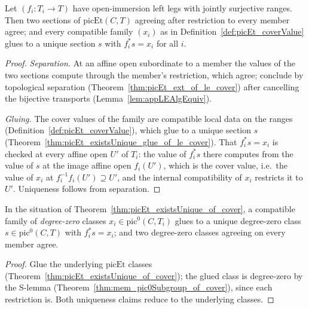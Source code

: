 \begin{theorem}
  \label{thm:picEt_existsUnique_of_cover}
  \leanok
  Let \((f_i \colon T_i \to T)\) have open-immersion left legs with jointly surjective
  ranges. Then two sections of \(\mathrm{picEt}(C,T)\) agreeing after restriction to every
  member agree; and every compatible family \((x_i)\) as in
  Definition~\ref{def:picEt_coverValue} glues to a unique section \(s\) with
  \(f_i^{*} s = x_i\) for all \(i\).
\end{theorem}
\begin{proof}
  \leanok
  \emph{Separation.} At an affine open subordinate to a member the values of the two
  sections compute through the member's restriction, which agree; conclude by topological
  separation (Theorem~\ref{thm:picEt_ext_of_le_cover}) after cancelling the bijective
  transports (Lemma~\ref{lem:appLEAlgEquiv}).

  \emph{Gluing.} The cover values of the family are compatible local data on the ranges
  (Definition~\ref{def:picEt_coverValue}), which glue to a unique section \(s\)
  (Theorem~\ref{thm:picEt_existsUnique_glue_of_le_cover}). That \(f_i^{*} s = x_i\) is
  checked at every affine open \(U'\) of \(T_i\): the value of \(f_i^{*}s\) there computes
  from the value of \(s\) at the image affine open \(f_i(U')\), which is the cover value,
  i.e.\ the value of \(x_i\) at \(f_i^{-1}f_i(U') \supseteq U'\), and the internal
  compatibility of \(x_i\) restricts it to \(U'\). Uniqueness follows from separation.
\end{proof}

\begin{theorem}
  \label{thm:pic0Subgroup_existsUnique_of_cover}
  \leanok
  In the situation of Theorem~\ref{thm:picEt_existsUnique_of_cover}, a compatible family of
  \emph{degree-zero} classes \(x_i \in \mathrm{pic}^0(C, T_i)\) glues to a unique degree-zero
  class \(s \in \mathrm{pic}^0(C,T)\) with \(f_i^{*} s = x_i\); and two degree-zero classes
  agreeing on every member agree.
\end{theorem}
\begin{proof}
  \leanok
  Glue the underlying \(\mathrm{picEt}\) classes
  (Theorem~\ref{thm:picEt_existsUnique_of_cover}); the glued class is degree-zero by the
  S-lemma (Theorem~\ref{thm:mem_pic0Subgroup_of_cover}), since each restriction is. Both
  uniqueness claims reduce to the underlying classes.
\end{proof}

